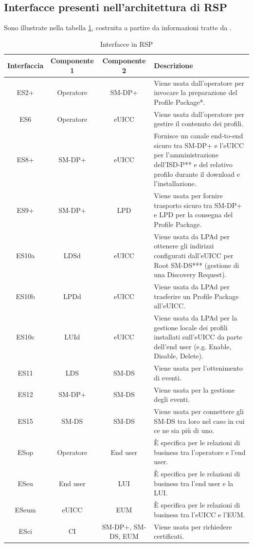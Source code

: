 \documentclass[10pt, twoside, openany]{book}
\begin{document}
\subsection{Interfacce presenti nell'architettura di RSP}
Sono illustrate nella tabella \ref{tab:interfaces}, costruita a partire da informazioni tratte da \cite{GSMA-docs}.
\begin{table}[h!]
\begin{center}
\captionsetup{skip=4pt}
\caption{Interfacce in RSP}
\label{tab:interfaces}
\begin{tabularx}{\textwidth}{|c|c|c|X|} %
\hline
\textbf{Interfaccia} & \textbf{Componente 1} & \textbf{Componente 2} & \textbf{Descrizione}\\
\hline
ES2+ & Operatore & SM-DP+ & Viene usata dall'operatore per invocare la preparazione del Profile Package*.\\
\hline
ES6 & Operatore & eUICC & Viene usata dall'operatore per gestire il contenuto dei profili.\\
\hline
ES8+ & SM-DP+ & eUICC & Fornisce un canale end-to-end sicuro tra SM-DP+ e l'eUICC per l'amministrazione dell'ISD-P** e del relativo profilo durante il download e l'installazione.\\
\hline
ES9+ & SM-DP+ & LPD & Viene usata per fornire trasporto sicuro tra SM-DP+ e LPD per la consegna del Profile Package.\\
\hline
ES10a & LDSd & eUICC & Viene usata da LPAd per ottenere gli indirizzi configurati dall'eUICC per Root SM-DS*** (gestione di una Discovery Request).\\
\hline
ES10b & LPDd & eUICC & Viene usata da LPAd per trasferire un Profile Package all'eUICC.\\
\hline
ES10c & LUId & eUICC & Viene usata da LPAd per la gestione locale dei profili installati sull'eUICC da parte dell'end user (e.g. Enable, Disable, Delete).\\
\hline
ES11 & LDS & SM-DS & Viene usata per l'ottenimento di eventi.\\
\hline
ES12 & SM-DP+ & SM-DS & Viene usata per la gestione degli eventi.\\
\hline
ES15 & SM-DS & SM-DS & Viene usata per connettere gli SM-DS tra loro nel caso in cui ce ne sia più di uno.\\
\hline
ESop & Operatore & End user & È specifica per le relazioni di business tra l'operatore e l'end user.\\
\hline
ESeu & End user & LUI & È specifica per le relazioni di business tra l'end user e la LUI.\\
\hline
ESeum & eUICC & EUM & È specifica per le relazioni di business tra l'eUICC e l'EUM.\\
\hline
ESci & CI & SM-DP+, SM-DS, EUM & Viene usata per richiedere certificati.\\
\hline
\end{tabularx}
\end{center}
\end{table}
\end{document}
